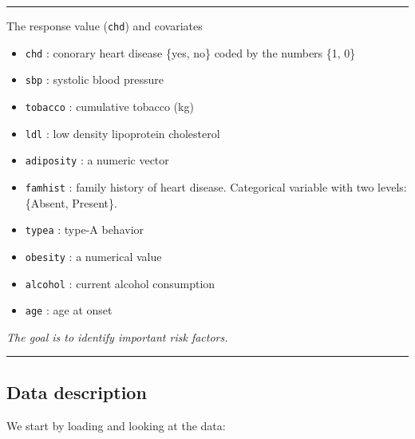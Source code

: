 \documentclass[
  letterpaper,
  DIV=11,
  numbers=noendperiod]{scrartcl}
\newenvironment{Shaded}{\begin{snugshade}}{\end{snugshade}}
\newcommand{\AttributeTok}[1]{\textcolor[rgb]{0.40,0.45,0.13}{#1}}
\newcommand{\DecValTok}[1]{\textcolor[rgb]{0.68,0.00,0.00}{#1}}
\newcommand{\FunctionTok}[1]{\textcolor[rgb]{0.28,0.35,0.67}{#1}}
\newcommand{\NormalTok}[1]{\textcolor[rgb]{0.00,0.23,0.31}{#1}}
\newcommand{\OtherTok}[1]{\textcolor[rgb]{0.00,0.23,0.31}{#1}}
\newcommand{\SpecialCharTok}[1]{\textcolor[rgb]{0.37,0.37,0.37}{#1}}
\newcommand{\StringTok}[1]{\textcolor[rgb]{0.13,0.47,0.30}{#1}}
\providecommand{\tightlist}{%
  \setlength{\itemsep}{0pt}\setlength{\parskip}{0pt}}\usepackage{longtable,booktabs,array}
\begin{document}
\begin{center}\rule{0.5\linewidth}{0.5pt}\end{center}

The response value (\texttt{chd}) and covariates

\begin{itemize}
\tightlist
\item
  \texttt{chd} : conorary heart disease \{yes, no\} coded by the numbers
  \{1, 0\}
\item
  \texttt{sbp} : systolic blood pressure\\
\item
  \texttt{tobacco} : cumulative tobacco (kg)\\
\item
  \texttt{ldl} : low density lipoprotein cholesterol
\item
  \texttt{adiposity} : a numeric vector
\item
  \texttt{famhist} : family history of heart disease. Categorical
  variable with two levels: \{Absent, Present\}.
\item
  \texttt{typea} : type-A behavior
\item
  \texttt{obesity} : a numerical value
\item
  \texttt{alcohol} : current alcohol consumption
\item
  \texttt{age} : age at onset
\end{itemize}

\emph{The goal is to identify important risk factors.}

\begin{center}\rule{0.5\linewidth}{0.5pt}\end{center}

\hypertarget{data-description}{%
\subsection{Data description}\label{data-description}}

We start by loading and looking at the data:

\begin{Shaded}
\end{Shaded}
\end{document}

